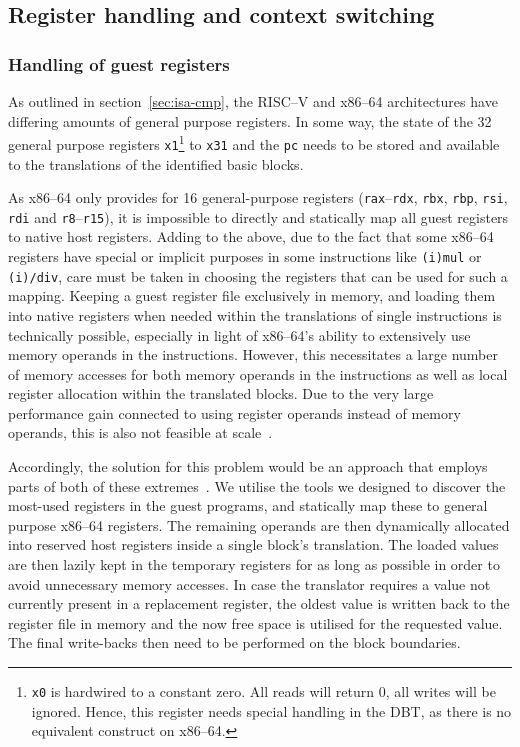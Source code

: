 \subsection{Register handling and context switching}
\label{sec:context-switch-reg-handle}

\subsubsection{Handling of guest registers}
\label{sec:reg-handle}
As outlined in section~\ref{sec:isa-cmp}, the RISC--V and x86--64 architectures have differing amounts of general purpose registers.
In some way, the state of the 32 general purpose registers \texttt{x1}\footnote{\texttt{x0} is hardwired to a constant zero. All reads will return 0, all writes will be ignored. Hence, this register needs special handling in the DBT, as there is no equivalent construct on x86--64.} to \texttt{x31} and the \texttt{pc} needs to be stored and available to the translations of the identified basic blocks.

As x86--64 only provides for 16 general-purpose registers (\texttt{rax}--\texttt{rdx}, \texttt{rbx}, \texttt{rbp}, \texttt{rsi}, \texttt{rdi} and \texttt{r8}--\texttt{r15}), it is impossible to directly and statically map all guest registers to native host registers.
Adding to the above, due to the fact that some x86--64 registers have special or implicit purposes in some instructions like \texttt{(i)mul} or \texttt{(i)/div}, care must be taken in choosing the registers that can be used for such a mapping.
Keeping a guest register file exclusively in memory, and loading them into native registers when needed within the translations of single instructions is technically possible, especially in light of x86--64's ability to extensively use memory operands in the instructions.
However, this necessitates a large number of memory accesses for both memory operands in the instructions as well as local register allocation within the translated blocks.
Due to the very large performance gain connected to using register operands instead of memory operands, this is also not feasible at scale~\cite[S. 8f.]{bintrans}.

Accordingly, the solution for this problem would be an approach that employs parts of both of these extremes~\cite[S. 9]{bintrans}.
We utilise the tools we designed to discover the most-used registers in the guest programs, and statically map these to general purpose x86--64 registers.
The remaining operands are then dynamically allocated into reserved host registers inside a single block's translation.
The loaded values are then lazily kept in the temporary registers for as long as possible in order to avoid unnecessary memory accesses.
In case the translator requires a value not currently present in a replacement register, the oldest value is written back to the register file in memory and the now free space is utilised for the requested value.
The final write-backs then need to be performed on the block boundaries.

